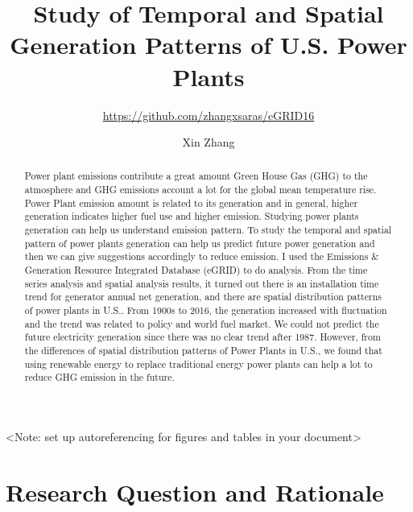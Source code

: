 \documentclass[12pt,]{article}
\title{Study of Temporal and Spatial Generation Patterns of U.S. Power Plants}
\subtitle{\url{https://github.com/zhangxsaras/eGRID16}}
\author{Xin Zhang}
\date{}
\begin{document}
\maketitle
\begin{abstract}
Power plant emissions contribute a great amount Green House Gas (GHG) to
the atmosphere and GHG emissions account a lot for the global mean
temperature rise. Power Plant emission amount is related to its
generation and in general, higher generation indicates higher fuel use
and higher emission. Studying power plants generation can help us
understand emission pattern. To study the temporal and spatial pattern
of power plants generation can help us predict future power generation
and then we can give suggestions accordingly to reduce emission. I used
the Emissions \& Generation Resource Integrated Database (eGRID) to do
analysis. From the time series analysis and spatial analysis results, it
turned out there is an installation time trend for generator annual net
generation, and there are spatial distribution patterns of power plants
in U.S.. From 1900s to 2016, the generation increased with fluctuation
and the trend was related to policy and world fuel market. We could not
predict the future electricity generation since there was no clear trend
after 1987. However, from the differences of spatial distribution
patterns of Power Plants in U.S., we found that using renewable energy
to replace traditional energy power plants can help a lot to reduce GHG
emission in the future.
\end{abstract}

\newpage

\tableofcontents  \newpage
\listoftables  \newpage
\listoffigures  \newpage

\textless{}Note: set up autoreferencing for figures and tables in your
document\textgreater{}

\section{Research Question and
Rationale}\label{research-question-and-rationale}
\end{document}
